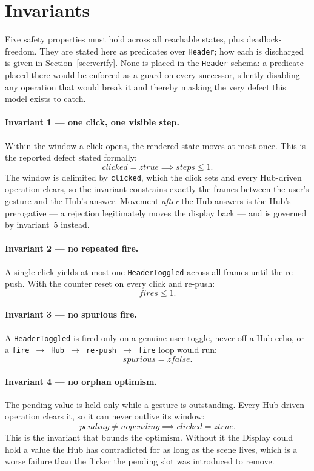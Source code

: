 \documentclass[a4paper,10pt,fleqn]{article}
\begin{document}
\section{Invariants}
\label{sec:inv}

Five safety properties must hold across all reachable states, plus
deadlock-freedom.  They are stated here as predicates over \texttt{Header};
how each is discharged is given in Section~\ref{sec:verify}.  None is placed in
the \texttt{Header} schema: a predicate placed there would be enforced as a
guard on every successor, silently disabling any operation that would break it
and thereby masking the very defect this model exists to catch.

\paragraph{Invariant 1 --- one click, one visible step.}
Within the window a click opens, the rendered state moves at most once.  This
is the reported defect stated formally:
\[
  clicked = ztrue \implies steps \leq 1.
\]
The window is delimited by \texttt{clicked}, which the click sets and every
Hub-driven operation clears, so the invariant constrains exactly the frames
between the user's gesture and the Hub's answer.  Movement \emph{after} the Hub
answers is the Hub's prerogative --- a rejection legitimately moves the display
back --- and is governed by invariant~5 instead.

\paragraph{Invariant 2 --- no repeated fire.}
A single click yields at most one \texttt{HeaderToggled} across all frames
until the re-push.  With the counter reset on every click and re-push:
\[
  fires \leq 1.
\]

\paragraph{Invariant 3 --- no spurious fire.}
A \texttt{HeaderToggled} is fired only on a genuine user toggle, never off a
Hub echo, or a \texttt{fire $\to$ Hub $\to$ re-push $\to$ fire} loop would run:
\[
  spurious = zfalse.
\]

\paragraph{Invariant 4 --- no orphan optimism.}
The pending value is held only while a gesture is outstanding.  Every
Hub-driven operation clears it, so it can never outlive its window:
\[
  pending \neq nopending \implies clicked = ztrue.
\]
This is the invariant that bounds the optimism.  Without it the Display could
hold a value the Hub has contradicted for as long as the scene lives, which is
a worse failure than the flicker the pending slot was introduced to remove.
\end{document}
